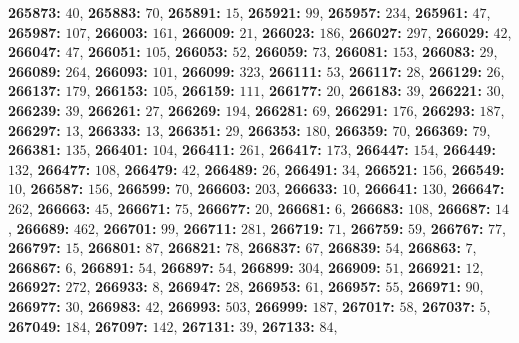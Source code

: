 \textsf{\bfseries 265873:} $40$, \textsf{\bfseries 265883:} $70$, \textsf{\bfseries 265891:} $15$, \textsf{\bfseries 265921:} $99$, \textsf{\bfseries 265957:} $234$, \textsf{\bfseries 265961:} $47$, \textsf{\bfseries 265987:} $107$, \textsf{\bfseries 266003:} $161$, \textsf{\bfseries 266009:} $21$, \textsf{\bfseries 266023:} $186$, \textsf{\bfseries 266027:} $297$, \textsf{\bfseries 266029:} $42$, \textsf{\bfseries 266047:} $47$, \textsf{\bfseries 266051:} $105$, \textsf{\bfseries 266053:} $52$, \textsf{\bfseries 266059:} $73$, \textsf{\bfseries 266081:} $153$, \textsf{\bfseries 266083:} $29$, \textsf{\bfseries 266089:} $264$, \textsf{\bfseries 266093:} $101$, \textsf{\bfseries 266099:} $323$, \textsf{\bfseries 266111:} $53$, \textsf{\bfseries 266117:} $28$, \textsf{\bfseries 266129:} $26$, \textsf{\bfseries 266137:} $179$, \textsf{\bfseries 266153:} $105$, \textsf{\bfseries 266159:} $111$, \textsf{\bfseries 266177:} $20$, \textsf{\bfseries 266183:} $39$, \textsf{\bfseries 266221:} $30$, \textsf{\bfseries 266239:} $39$, \textsf{\bfseries 266261:} $27$, \textsf{\bfseries 266269:} $194$, \textsf{\bfseries 266281:} $69$, \textsf{\bfseries 266291:} $176$, \textsf{\bfseries 266293:} $187$, \textsf{\bfseries 266297:} $13$, \textsf{\bfseries 266333:} $13$, \textsf{\bfseries 266351:} $29$, \textsf{\bfseries 266353:} $180$, \textsf{\bfseries 266359:} $70$, \textsf{\bfseries 266369:} $79$, \textsf{\bfseries 266381:} $135$, \textsf{\bfseries 266401:} $104$, \textsf{\bfseries 266411:} $261$, \textsf{\bfseries 266417:} $173$, \textsf{\bfseries 266447:} $154$, \textsf{\bfseries 266449:} $132$, \textsf{\bfseries 266477:} $108$, \textsf{\bfseries 266479:} $42$, \textsf{\bfseries 266489:} $26$, \textsf{\bfseries 266491:} $34$, \textsf{\bfseries 266521:} $156$, \textsf{\bfseries 266549:} $10$, \textsf{\bfseries 266587:} $156$, \textsf{\bfseries 266599:} $70$, \textsf{\bfseries 266603:} $203$, \textsf{\bfseries 266633:} $10$, \textsf{\bfseries 266641:} $130$, \textsf{\bfseries 266647:} $262$, \textsf{\bfseries 266663:} $45$, \textsf{\bfseries 266671:} $75$, \textsf{\bfseries 266677:} $20$, \textsf{\bfseries 266681:} $6$, \textsf{\bfseries 266683:} $108$, \textsf{\bfseries 266687:} $14$, \textsf{\bfseries 266689:} $462$, \textsf{\bfseries 266701:} $99$, \textsf{\bfseries 266711:} $281$, \textsf{\bfseries 266719:} $71$, \textsf{\bfseries 266759:} $59$, \textsf{\bfseries 266767:} $77$, \textsf{\bfseries 266797:} $15$, \textsf{\bfseries 266801:} $87$, \textsf{\bfseries 266821:} $78$, \textsf{\bfseries 266837:} $67$, \textsf{\bfseries 266839:} $54$, \textsf{\bfseries 266863:} $7$, \textsf{\bfseries 266867:} $6$, \textsf{\bfseries 266891:} $54$, \textsf{\bfseries 266897:} $54$, \textsf{\bfseries 266899:} $304$, \textsf{\bfseries 266909:} $51$, \textsf{\bfseries 266921:} $12$, \textsf{\bfseries 266927:} $272$, \textsf{\bfseries 266933:} $8$, \textsf{\bfseries 266947:} $28$, \textsf{\bfseries 266953:} $61$, \textsf{\bfseries 266957:} $55$, \textsf{\bfseries 266971:} $90$, \textsf{\bfseries 266977:} $30$, \textsf{\bfseries 266983:} $42$, \textsf{\bfseries 266993:} $503$, \textsf{\bfseries 266999:} $187$, \textsf{\bfseries 267017:} $58$, \textsf{\bfseries 267037:} $5$, \textsf{\bfseries 267049:} $184$, \textsf{\bfseries 267097:} $142$, \textsf{\bfseries 267131:} $39$, \textsf{\bfseries 267133:} $84$, 
